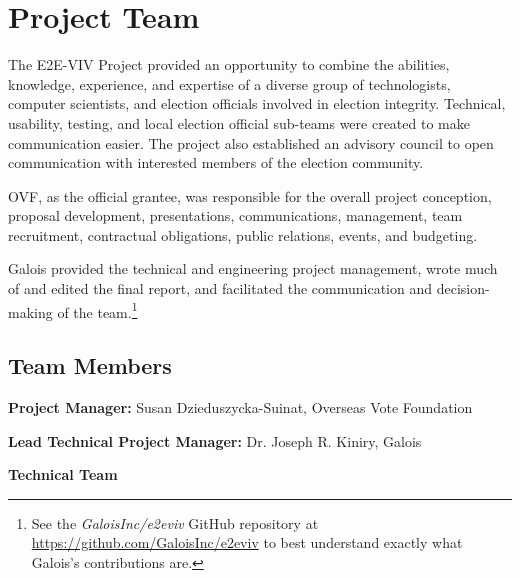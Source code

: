 \section{Project Team}
\label{sec:people}

The E2E-VIV Project provided an opportunity to combine the abilities,
knowledge, experience, and expertise of a diverse group of
technologists, computer scientists, and election officials involved in
election integrity. Technical, usability, testing, and local election
official sub-teams were created to make communication easier. The
project also established an advisory council to open communication
with interested members of the election community.

OVF, as the official grantee, was responsible for the overall project
conception, proposal development, presentations, communications,
management, team recruitment, contractual obligations, public
relations, events, and budgeting. 

Galois provided the technical and engineering project management,
wrote much of and edited the final report, and facilitated the
communication and decision-making of the team.\footnote{See the
  \emph{GaloisInc/e2eviv} GitHub repository at
  \url{https://github.com/GaloisInc/e2eviv} to best understand exactly
  what Galois's contributions are.}

\subsection{Team Members}
\label{sec:team-members}

\textbf{Project Manager:} Susan Dzieduszycka-Suinat, Overseas Vote Foundation

\textbf{Lead Technical Project Manager:} Dr. Joseph R. Kiniry, Galois

\textbf{Technical Team}

